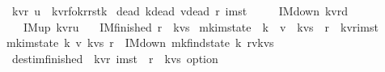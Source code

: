 \begin{isabellebody}
\ {\isacharparenleft}{\isacharprime}k{\isacharcomma}{\isacharprime}v{\isacharcomma}{\isacharprime}r{\isacharparenright}\ u\ {\isacharequal}\ {\isachardoublequoteopen}{\isacharparenleft}{\isacharprime}k{\isacharcomma}{\isacharprime}v{\isacharcomma}{\isacharprime}r{\isacharparenright}fo{\isacharasterisk}{\isacharparenleft}{\isacharprime}k{\isacharcomma}{\isacharprime}r{\isacharparenright}rstk{\isachardoublequoteclose}\isanewline
\isanewline
{}\isamarkupfalse%
\ {\isacharparenleft}dead\ {\isacharprime}k{\isacharcomma}dead\ {\isacharprime}v{\isacharcomma}dead\ {\isacharprime}r{\isacharparenright}\ imst\ \ {\isacharequal}\ \isanewline
\ \ IM{\isacharunderscore}down\ {\isachardoublequoteopen}{\isacharparenleft}{\isacharprime}k{\isacharcomma}{\isacharprime}v{\isacharcomma}{\isacharprime}r{\isacharparenright}d{\isachardoublequoteclose}\isanewline
\ \ {\isacharbar}\ IM{\isacharunderscore}up\ {\isachardoublequoteopen}{\isacharparenleft}{\isacharprime}k{\isacharcomma}{\isacharprime}v{\isacharcomma}{\isacharprime}r{\isacharparenright}u{\isachardoublequoteclose}\isanewline
\ \ {\isacharbar}\ IM{\isacharunderscore}finished\ {\isachardoublequoteopen}{\isacharprime}r\ {\isacharasterisk}\ {\isacharparenleft}{\isacharprime}k{\isacharasterisk}{\isacharprime}v{\isacharparenright}s{\isachardoublequoteclose}\isanewline
\isanewline
{}\isamarkupfalse%
\ mk{\isacharunderscore}im{\isacharunderscore}state\ {\isacharcolon}{\isacharcolon}\ {\isachardoublequoteopen}{\isacharprime}k\ {\isasymRightarrow}\ {\isacharprime}v\ {\isasymRightarrow}\ {\isacharparenleft}{\isacharprime}k{\isacharasterisk}{\isacharprime}v{\isacharparenright}s\ {\isasymRightarrow}\ {\isacharprime}r\ {\isasymRightarrow}\ {\isacharparenleft}{\isacharprime}k{\isacharcomma}{\isacharprime}v{\isacharcomma}{\isacharprime}r{\isacharparenright}imst{\isachardoublequoteclose}\ \isanewline
{\isachardoublequoteopen}mk{\isacharunderscore}im{\isacharunderscore}state\ k\ v\ kvs\ r\ {\isacharequal}\ {\isacharparenleft}IM{\isacharunderscore}down\ {\isacharparenleft}mk{\isacharunderscore}find{\isacharunderscore}state\ k\ r{\isacharcomma}{\isacharparenleft}v{\isacharcomma}kvs{\isacharparenright}{\isacharparenright}{\isacharparenright}{\isachardoublequoteclose}\isanewline
\isanewline
\isanewline
{}\isamarkupfalse%
\ dest{\isacharunderscore}im{\isacharunderscore}finished\ {\isacharcolon}{\isacharcolon}\ {\isachardoublequoteopen}{\isacharparenleft}{\isacharprime}k{\isacharcomma}{\isacharprime}v{\isacharcomma}{\isacharprime}r{\isacharparenright}\ imst\ {\isasymRightarrow}\ {\isacharparenleft}{\isacharprime}r\ {\isacharasterisk}\ {\isacharparenleft}{\isacharprime}k{\isacharasterisk}{\isacharprime}v{\isacharparenright}s{\isacharparenright}\ option{\isachardoublequoteclose}\ \isanewline

\end{isabellebody}
